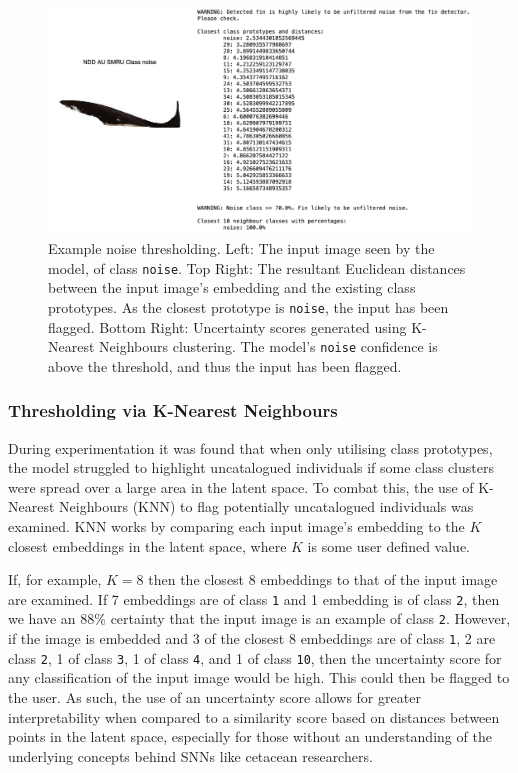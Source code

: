 \begin{figure}[t]
	\begin{center}
		\includegraphics[scale=0.5]{Chapter5/figs/noise-example-ndd-au-smru.png}
	\end{center}
	\caption{Example noise thresholding. Left: The input image seen by the model, of class \texttt{noise}. Top Right: The resultant Euclidean distances between the input image's embedding and the existing class prototypes. As the closest prototype is \texttt{noise}, the input has been flagged. Bottom Right: Uncertainty scores generated using K-Nearest Neighbours clustering. The model's \texttt{noise} confidence is above the threshold, and thus the input has been flagged.}
	\label{fig:noise-individual-example-ndd-au-smru}
\end{figure}

\subsubsection{Thresholding via K-Nearest Neighbours}\label{ch:ID,sec:ModelSelection,subsec:UncataloguedIndividualThresholding,subsub:KNN}

 During experimentation it was found that when only utilising class prototypes, the model struggled to highlight uncatalogued individuals if some class clusters were spread over a large area in the latent space. To combat this, the use of K-Nearest Neighbours (KNN) to flag potentially uncatalogued individuals was examined. KNN works by comparing each input image's embedding to the $K$ closest embeddings in the latent space, where $K$ is some user defined value. 
 
 If, for example, $K = 8$ then the closest 8 embeddings to that of the input image are examined. If 7 embeddings are of class \texttt{1} and 1 embedding is of class \texttt{2}, then we have an 88\% certainty that the input image is an example of class \texttt{2}. However, if the image is embedded and 3 of the closest 8 embeddings are of class \texttt{1}, 2 are class \texttt{2}, 1 of class \texttt{3}, 1 of class \texttt{4}, and 1 of class \texttt{10}, then the uncertainty score for any classification of the input image would be high. This could then be flagged to the user. As such, the use of an uncertainty score allows for greater interpretability when compared to a similarity score based on distances between points in the latent space, especially for those without an understanding of the underlying concepts behind SNNs like cetacean researchers. 

